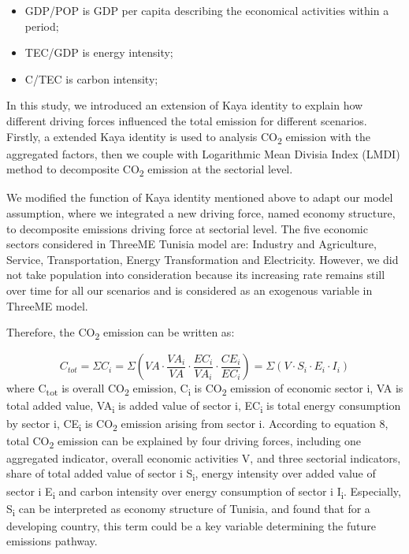 \documentclass[
]{article}
\providecommand{\tightlist}{%
  \setlength{\itemsep}{0pt}\setlength{\parskip}{0pt}}
\begin{document}
\begin{itemize}
\tightlist
\item
  GDP/POP is GDP per capita describing the economical activities within
  a period;
\item
  TEC/GDP is energy intensity;
\item
  C/TEC is carbon intensity;
\end{itemize}

In this study, we introduced an extension of Kaya identity to explain
how different driving forces influenced the total emission for different
scenarios. Firstly, a extended Kaya identity is used to analysis
CO\textsubscript{2} emission with the aggregated factors, then we couple
with Logarithmic Mean Divisia Index (LMDI) method to decomposite
CO\textsubscript{2} emission at the sectorial level.

We modified the function of Kaya identity mentioned above to adapt our
model assumption, where we integrated a new driving force, named economy
structure, to decomposite emissions driving force at sectorial level.
The five economic sectors considered in ThreeME Tunisia model are:
Industry and Agriculture, Service, Transportation, Energy Transformation
and Electricity. However, we did not take population into consideration
because its increasing rate remains still over time for all our
scenarios and is considered as an exogenous variable in ThreeME model.

Therefore, the CO\textsubscript{2} emission can be written as:

\[  C_{tot} = \Sigma C_{i} = \Sigma( VA \cdot \frac{VA_{i}}{VA} \cdot \frac{EC_{i}}{VA_{i}} \cdot \frac{CE_{i}}{EC_{i}} )=  \Sigma( V \cdot S_{i} \cdot E_{i} \cdot I_{i}) \tag{2}\]
where C\textsubscript{tot} is overall CO\textsubscript{2} emission,
C\textsubscript{i} is CO\textsubscript{2} emission of economic sector i,
VA is total added value, VA\textsubscript{i} is added value of sector i,
EC\textsubscript{i} is total energy consumption by sector i,
CE\textsubscript{i} is CO\textsubscript{2} emission arising from sector
i. According to equation 8, total CO\textsubscript{2} emission can be
explained by four driving forces, including one aggregated indicator,
overall economic activities V, and three sectorial indicators, share of
total added value of sector i S\textsubscript{i}, energy intensity over
added value of sector i E\textsubscript{i} and carbon intensity over
energy consumption of sector i I\textsubscript{i}. Especially,
S\textsubscript{i} can be interpreted as economy structure of Tunisia,
\textcite{grubb2015} and \textcite{kanitkar2015} found that for a
developing country, this term could be a key variable determining the
future emissions pathway.
\end{document}

